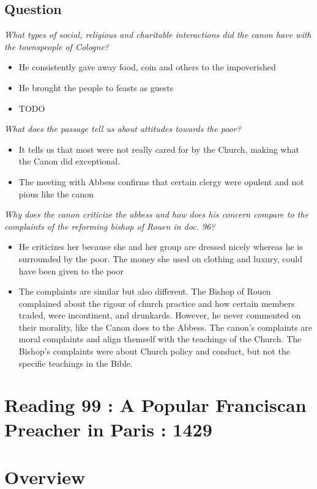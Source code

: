 \documentclass[12pt]{article}
\begin{document}
\subsection*{Question}
\textit{What types of social, religious and charitable interactions did the canon have with the townspeople of Cologne?}
\begin{itemize}
	\item He consistently gave away food, coin and others to the impoverished
	\item He brought the people to feasts as guests
	\item TODO
\end{itemize}

\textit{What does the passage tell us about attitudes towards the poor?}
\begin{itemize}
	\item It tells us that most were not really cared for by the Church, making what the Canon did exceptional.
	\item The meeting with Abbess confirms that certain clergy were opulent and not pious like the canon
\end{itemize}

\textit{Why does the canon criticize the abbess and how does his concern compare to the complaints of the reforming bishop of Rouen in doc. 96?}
\begin{itemize}
	\item He criticizes her because she and her group are dressed nicely whereas he is surrounded by the poor. The money she used on clothing and luxury, could have been given to the poor
	\item The complaints are similar but also different. The Bishop of Rouen complained about the rigour of church practice and how certain members traded, were incontinent, and drunkards. However, he never commented on their morality, like the Canon does to the Abbess. The canon's complaints are moral complaints and align themself with the teachings of the Church. The Bishop's complaints were about Church policy and conduct, but not the specific teachings in the Bible.
\end{itemize}

\section*{Reading 99 : A Popular Franciscan Preacher in Paris : 1429}

\section*{Overview}
\end{document}
